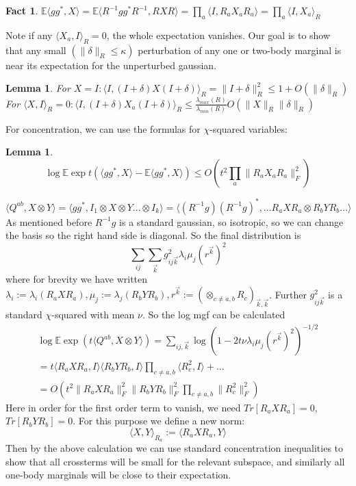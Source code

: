 \documentclass{article}
\newtheorem{lemma}[theorem]{Lemma}
\newtheorem{fact}[theorem]{Fact}
\newcommand{\E}{\mathbb{E}}
\begin{document}
\begin{fact}
$ \E \langle g g^{*}, X \rangle = \E \langle R^{-1} g g^{*} R^{-1}, R X R \rangle = \prod_{a} \langle I, R_{a} X_{a} R_{a} \rangle = \prod_{a} \langle I, X_{a} \rangle_{R} $
\end{fact}

Note if any $\langle X_{a}, I \rangle_{R} = 0$, the whole expectation vanishes. Our goal is to show that any small $(\|\delta\|_{R} \leq \kappa)$ perturbation of any one or two-body marginal is near its expectation for the unperturbed gaussian. 

\begin{lemma}
For $X = I: \langle I, (I + \delta)X(I+\delta) \rangle_{R} = \|I+\delta\|_{R}^{2} \leq 1 + O(\|\delta\|_{R})$
\\ For $\langle X, I \rangle_{R} = 0: \langle I, (I + \delta)X_{a}(I+\delta) \rangle_{R} \leq \frac{\lambda_{max}(R)}{\lambda_{min}(R)} O( \|X\|_{R} \|\delta\|_{R} )$
\end{lemma}

For concentration, we can use the formulas for $\chi$-squared variables:

\begin{lemma}
\[ \log \E \exp t( \langle g g^{*}, X \rangle - \E \langle g g^{*}, X \rangle ) \leq O \left( t^{2} \prod_{a} \|R_{a} X_{a} R_{a}\|_{F}^{2}  \right)  \]
\end{lemma}


\[ \langle Q^{ab}, X \otimes Y \rangle = \langle g g^{*}, I_{1} \otimes X \otimes Y ... \otimes I_{k} \rangle = \langle (R^{-1} g) (R^{-1} g)^{*}, ...  R_{a} X R_{a} \otimes R_{b} Y R_{b} ... \rangle   \]
As mentioned before $R^{-1} g$ is a standard gaussian, so isotropic, so we can change the basis so the right hand side is diagonal. So the final distribution is
\[ \sum_{ij} \sum_{\vec{k}} g_{ij\vec{k}}^{2} \lambda_{i} \mu_{j} (r^{\vec{k}})^{2}  \]
where for brevity we have written $\lambda_{i} := \lambda_{i}(R_{a} X R_{a}), \mu_{j} := \lambda_{j}(R_{b} Y R_{b}), r^{\vec{k}} := (\otimes_{c \neq a,b} R_{c})_{\vec{k},\vec{k}}$. Further $g_{ij\vec{k}}^{2}$ is a standard $\chi$-squared with mean $\nu$. So the log mgf can be calculated
\begin{align*}
\log \E \exp (t \langle Q^{ab}, X \otimes Y \rangle) =  \sum_{ij,\vec{k}} \log (1 - 2t\nu \lambda_{i} \mu_{j} (r^{\vec{k}})^{2})^{-1/2} 
\\ = t \langle R_{a} X R_{a}, I \rangle \langle R_{b} Y R_{b}, I \rangle \prod_{c \neq a,b} \langle R_{c}^{2}, I \rangle + ... 
\\ = O \left( t^{2} \|R_{a} X R_{a}\|_{F}^{2} \|R_{b} Y R_{b}\|_{F}^{2} \prod_{c \neq a,b} \|R_{c}^{2}\|_{F}^{2}   \right)
\end{align*} 
Here in order for the first order term to vanish, we need $Tr[R_{a} X R_{a}] = 0$, $Tr[R_{b} Y R_{b}] = 0$. For this purpose we define a new norm: 
\[ \langle X,Y \rangle_{R_{a}} := \langle R_{a} X R_{a}, Y \rangle \]
Then by the above calculation we can use standard concentration inequalities to show that all crossterms will be small for the relevant subspace, and similarly all one-body marginals will be close to their expectation.  
\end{document}
